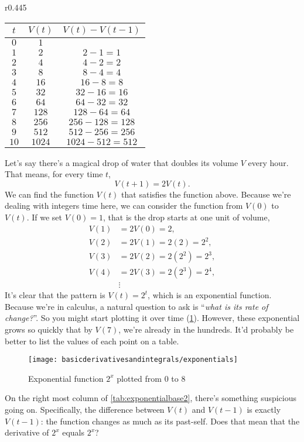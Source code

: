 \begin{wraptable}{r}{0.445\textwidth}
    \centering
    \begin{tabular}{c | c | c}
        $t$ & $V(t)$ & $V(t) - V(t - 1)$ \\
        \hline
        $0$ & $1$ & \\
        $1$ & $2$ & $2 - 1 = 1$ \\
        $2$ & $4$ & $4 - 2 = 2$ \\
        $3$ & $8$ & $8 - 4 = 4$ \\
        $4$ & $16$ & $16 - 8 = 8$ \\
        $5$ & $32$ & $32 - 16 = 16$ \\
        $6$ & $64$ & $64 - 32 = 32$ \\
        $7$ & $128$ & $128 - 64 = 64$ \\
        $8$ & $256$ & $256 - 128 = 128$ \\
        $9$ & $512$ & $512 - 256 = 256$ \\
        $10$ & $1024$ & $1024 - 512 = 512$
    \end{tabular}
    \caption{Tables of $2^x$ plotted at interval $1$ from $0$ to $10$}
    \label{tab:exponentialbase2}
\end{wraptable}

Let's say there's a magical drop of water that doubles its volume $V$ every hour. That means, for every time $t$,
\begin{equation}
    V(t + 1) = 2V(t). \label{eq:exponentialsrecurrencerelations}
\end{equation}
We can find the function $V(t)$ that satisfies the function above. Because we're dealing with integers time here, we can consider the function from $V(0)$ to $V(t)$. If we set $V(0) = 1$, that is the drop starts at one unit of volume,
\begin{align*}
    V(1) &= 2V(0) = 2, \\
    V(2) &= 2V(1) = 2(2) = 2^2, \\
    V(3) &= 2V(2) = 2(2^2) = 2^3, \\
    V(4) &= 2V(3) = 2(2^3) = 2^4, \\
    &\vdots
\end{align*}
It's clear that the pattern is $V(t) = 2^t$, which is an exponential function. Because we're in calculus, a natural question to ask is ``\emph{what is its rate of change?}''. So you might start plotting it over time (\cref{fig:exponentialgraph}). However, these exponential grows so quickly that by $V(7)$, we're already in the hundreds. It'd probably be better to list the values of each point on a table.
\begin{figure}[t]
    \centering
    \texttt{[image: basicderivativesandintegrals/exponentials]}
    \caption{Exponential function $2^x$ plotted from $0$ to $8$}
    \label{fig:exponentialgraph}
\end{figure}
On the right most column of \cref{tab:exponentialbase2}, there's something suspicious going on. Specifically, the difference between $V(t)$ and $V(t - 1)$ is exactly $V(t - 1)$: the function changes as much as its past-self. Does that mean that the derivative of $2^x$ equals $2^x$?

